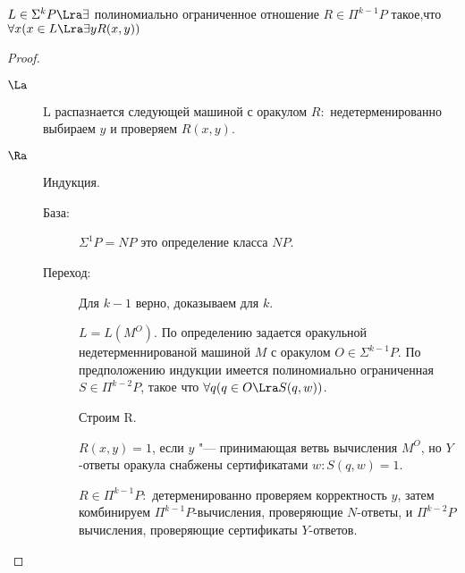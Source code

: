 \begin{theorem}
$L \in \Sigma^{k}P \Lra \exists$ полиномиально ограниченное отношение 
$R \in \Pi^{k - 1}P$ такое,что $\forall x (x \in L \Lra \exists y R(x, y))$
\end{theorem}
\begin{proof}
\begin{description}
\item[$\La$] L распазнается следующей машиной с оракулом $R:$
недетерменированно выбираем $y$ и проверяем $R(x, y)$.
\item[$\Ra$] Индукция. 
    \begin{description}
    \item[База:]
    $\Sigma^1 P = NP$ это определение класса $NP$.
    \item[Переход:] 
    Для $k - 1$ верно, доказываем для $k$.
    
    $L = L(M^O)$.
    По определению задается оракульной недетерменнированой 
    машиной $M$ с оракулом $O \in \Sigma^{k - 1}P$. По
    предположению индукции имеется полиномиально
    ограниченная $S \in \Pi^{k - 2}P$, такое что
    $\forall q(q \in O \Lra S(q, w))$.

    Строим R.

   $R(x, y) = 1$, если $y$ "--- принимающая ветвь вычисления
   $M^O$, но $Y$-ответы оракула снабжены сертификатами
   $w\colon S(q, w) = 1$.

  $R \in \Pi^{k - 1}P:$ детерменированно проверяем
  корректность $y$, затем комбинируем $\Pi^{k - 1}P$-вычисления,
  проверяющие $N$-ответы, и $\Pi^{k - 2}P$ вычисления, проверяющие
  сертификаты $Y$-ответов.  
    \end{description}
\end{description}
\end{proof}             

